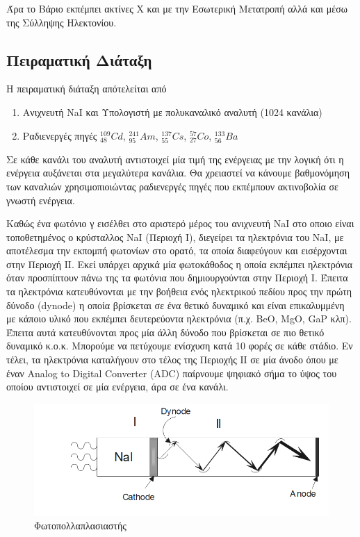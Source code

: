 \documentclass[a4paper]{article}
\begin{document}
	Άρα το Βάριο εκπέμπει ακτίνες Χ και με την Εσωτερική Μετατροπή αλλά και μέσω της Σύλληψης Ηλεκτονίου.
\subsection*{Πειραματική Διάταξη }
	Η πειραματική διάταξη απότελείται από 
		\begin{enumerate}
			\item Ανιχνευτή NaI και Υπολογιστή με πολυκαναλικό αναλυτή (1024 κανάλια)
			\item Ραδιενεργές πηγές $^{109}_{48}Cd$, $^{241}_{95}Am$, $^{137}_{55}Cs$, $^{57}_{27}Co$, $^{133}_{56}Ba$
		\end{enumerate}
		Σε κάθε κανάλι του αναλυτή αντιστοιχεί μία τιμή της ενέργειας με την λογική ότι η ενέργεια αυξάνεται στα μεγαλύτερα κανάλια. Θα χρειαστεί να κάνουμε βαθμονόμηση των καναλιών χρησιμοπιοιώντας ραδιενεργές πηγές που εκπέμπουν ακτινοβολία σε γνωστή ενέργεια.
		
		Καθώς ένα φωτόνιο γ εισέλθει στο αριστερό μέρος του ανιχνευτή NaI στο οποιο είναι τοποθετημένος ο κρύσταλλος NaI (Περιοχή Ι), διεγείρει τα ηλεκτρόνια του NaI, με αποτέλεσμα την εκπομπή φωτονίων στο ορατό, τα οποία διαφεύγουν και εισέρχονται στην Περιοχή ΙΙ. Εκεί υπάρχει αρχικά μία φωτοκάθοδος η οποία εκπέμπει ηλεκτρόνια όταν προσπίπτουν πάνω της τα φωτόνια που δημιουργούνται στην Περιοχή Ι. Έπειτα τα ηλεκτρόνια κατευθύνονται με την βοήθεια ενός ηλεκτρικού πεδίου προς την πρώτη δύνοδο (dynode) η οποία βρίσκεται σε ένα θετικό δυναμικό και είναι επικαλυμμένη με κάποιο υλικό που εκπέμπει δευτερεύοντα ηλεκτρόνια (π.χ. BeO, MgO, GaP κλπ). Έπειτα αυτά κατευθύνονται προς μία άλλη δύνοδο που βρίσκεται σε πιο θετικό δυναμικό κ.ο.κ. Μπορούμε να πετύχουμε ενίσχυση κατά 10 φορές σε κάθε στάδιο. Εν τέλει, τα ηλεκτρόνια καταλήγουν στο τέλος της Περιοχής ΙΙ σε μία άνοδο όπου με έναν Analog to Digital Converter (ADC) παίρνουμε ψηφιακό σήμα το ύψος του οποίου αντιστοιχεί σε μία ενέργεια, άρα σε ένα κανάλι.
	
	\begin{figure}[h!]
		\centering
		\includegraphics[scale=0.5]{ph_mult.png}	
		\caption{Φωτοπολλαπλασιαστής}
		\label{im1}
	\end{figure}			
		
\end{document}
